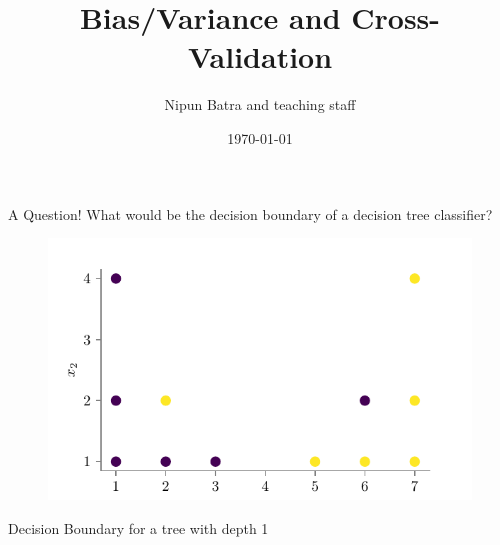 \documentclass[usenames,dvipsnames]{beamer}
\title{Bias/Variance and Cross-Validation}
\date{\today}
\author{Nipun Batra and teaching staff}
\institute{IIT Gandhinagar}
\begin{document}
	\maketitle
	
	

	\begin{frame}{A Question!}
What would be the decision boundary of a decision tree classifier? 

\begin{figure}
	\centering
	\includegraphics{../assets/bias-variance/figures/bias-variance-dataset.pdf}
\end{figure}


\end{frame}

\begin{frame}{Decision Boundary for a tree with depth 1}
\begin{figure}%
\centering
{}%
\qquad
{}%
\label{fig:example}%
\end{figure}
\end{frame}
\end{document}
